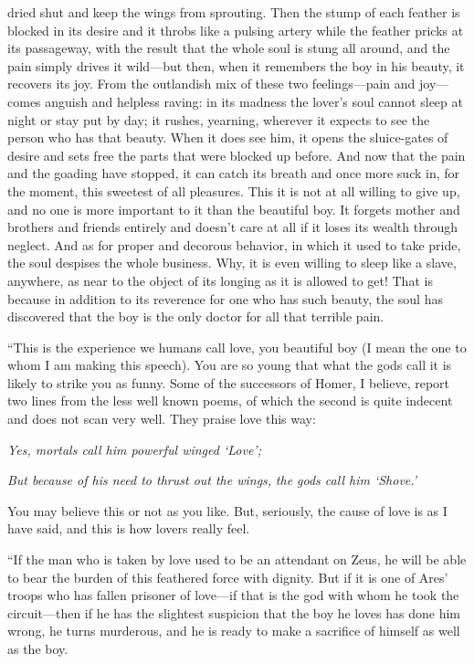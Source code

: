 dried shut and keep the wings from sprouting. Then the stump of each
feather is blocked in its desire and it throbs like a pulsing artery
while the feather pricks at its passageway, with the result that the
whole soul is stung all around, and the pain simply drives it wild---but
then, when it remembers the boy in his beauty, it recovers its joy. From
the outlandish mix of these two feelings---pain and joy---comes anguish
and helpless raving: in its madness the lover's soul cannot 
sleep at night or stay put by day; it rushes, yearning, wherever it
expects to see the person who has that beauty. When it does see him, it
opens the sluice-gates of desire and sets free the parts that were
blocked up before. And now that the pain and the goading have stopped,
it can catch its breath and once more suck in, for the moment, this
sweetest of all pleasures. This it is not at all willing to give up, and
no one is more important to it than the beautiful boy.
It forgets mother and brothers and friends entirely and doesn't care at
all if it loses its wealth through neglect. And as for proper and
decorous behavior, in which it used to take pride, the soul despises the
whole business. Why, it is even willing to sleep like a slave, anywhere,
as near to the object of its longing as it is allowed to get! That is
because in addition to its reverence for one who has such beauty, the 
soul has discovered that the boy is the only doctor for all that
terrible pain.

“This is the experience we humans call love, you beautiful boy (I mean
the one to whom I am making this
speech). You are so
young that what the gods call it is likely to strike you as funny. Some
of the successors of Homer, I believe, report two lines from the less
well known poems, of which the second is quite indecent and does not
scan very well. They praise love this way:\crlf
\crlf

{\em Yes, mortals call him powerful winged ‘Love';}

{\em But because of his need to thrust out the wings,} {\em the gods
call him
‘Shove.'}\crlf
\crlf

You may believe this or not as you like. But, seriously, the cause of
love is as I have said, and this is how lovers really feel.

“If the man who is taken by love used to be an attendant on Zeus, he
will be able to bear the burden of this feathered force with dignity.
But if it is one of Ares' troops who has fallen prisoner of love---if
that is the god with whom he took the circuit---then if he has the
slightest suspicion that the boy he loves has done him wrong, he turns
murderous, and he is ready to make a sacrifice of himself as well as the
boy.

